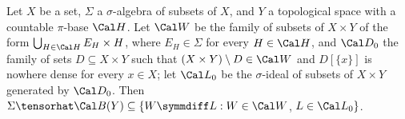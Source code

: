 
 Let $X$ be a set, $\Sigma$ a $\sigma$-algebra of
subsets of $X$, and $Y$ a topological space with a countable $\pi$-base
$\Cal H$.   Let $\Cal W$ be the family of subsets of $X\times Y$ of the
form $\bigcup_{H\in\Cal H}E_H\times H$, where $E_H\in\Sigma$ for every
$H\in\Cal H$, and
$\Cal D_0$ the family of sets $D\subseteq X\times Y$ such that
$(X\times Y)\setminus D\in\Cal W$ and $D[\{x\}]$ is nowhere dense for
every $x\in X$;  let $\Cal L_0$ be the $\sigma$-ideal of subsets of
$X\times Y$ generated by $\Cal D_0$.   Then
$\Sigma\tensorhat\Cal B(Y)
\subseteq\{W\symmdiff L:W\in\Cal W$, $L\in\Cal L_0\}$.

